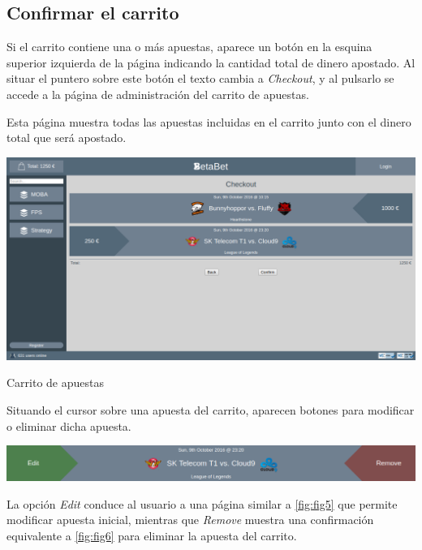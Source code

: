\documentclass{article}
\newcommand{\myarrow}{\ding{223}}
\begin{document}
\subsection{Confirmar el carrito}
Si el carrito contiene una o más apuestas, aparece un botón en la esquina superior izquierda de la página indicando la cantidad total de dinero apostado. Al situar el puntero sobre este botón el texto cambia a \textit{Checkout}, y al pulsarlo se accede a la página de administración del carrito de apuestas.
\begin{center}
    \raisebox{-.6\height}{\scalebox{2}{\myarrow}}
\end{center}
Esta página muestra todas las apuestas incluidas en el carrito junto con el dinero total que será apostado.
\smallbreak
\begin{minipage}{\linewidth}
    \centering
    \captionsetup{type=figure}
    \includegraphics[width=\linewidth]{fig7}
    \caption{Carrito de apuestas}
    \label{fig:fig7}
\end{minipage}
\smallbreak
Situando el cursor sobre una apuesta del carrito, aparecen botones para modificar o eliminar dicha apuesta.
\begin{center}
    \includegraphics[width=.8\linewidth]{checkout3}
\end{center}
La opción \textit{Edit} conduce al usuario a una página similar a \autoref{fig:fig5} que permite modificar apuesta inicial, mientras que \textit{Remove} muestra una confirmación equivalente a \autoref{fig:fig6} para eliminar la apuesta del carrito.
\end{document}
